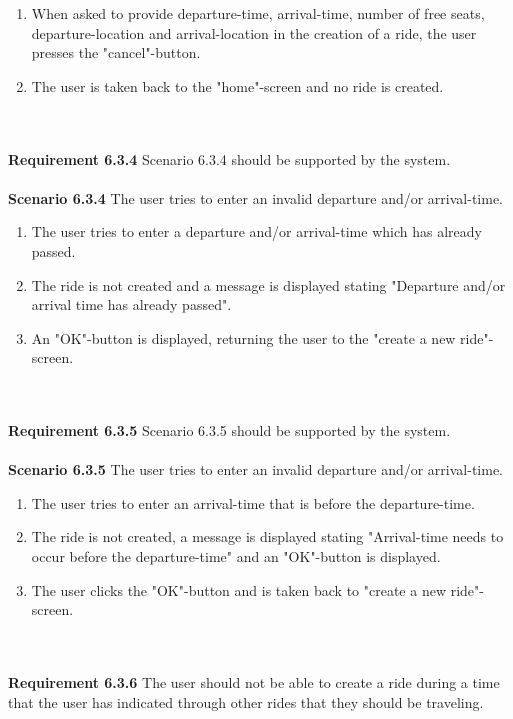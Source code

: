 \documentclass{article}
\begin{document}
\begin{enumerate}
    \item When asked to provide departure-time, arrival-time, number of free seats, departure-location and arrival-location in the creation of a ride, the user presses the "cancel"-button.
    \item The user is taken back to the "home"-screen and no ride is created.
\end{enumerate}
\mbox{}\\ \\
\textbf{Requirement 6.3.4} Scenario 6.3.4 should be supported by the system.
\\ \\
\textbf{Scenario 6.3.4} The user tries to enter an invalid departure and/or arrival-time.

\begin{enumerate}
    \item The user tries to enter a departure and/or arrival-time which has already passed.
    \item The ride is not created and a message is displayed stating "Departure and/or arrival time has already passed".
    \item An "OK"-button is displayed, returning the user to the "create a new ride"-screen.
\end{enumerate}
\mbox{}\\ \\
\textbf{Requirement 6.3.5} Scenario 6.3.5 should be supported by the system.
\\ \\
\textbf{Scenario 6.3.5} The user tries to enter an invalid departure and/or arrival-time.

\begin{enumerate}
    \item The user tries to enter an arrival-time that is before the departure-time.
    \item The ride is not created, a message is displayed stating "Arrival-time needs to occur before the departure-time" and an "OK"-button is displayed.
    \item The user clicks the "OK"-button and is taken back to "create a new ride"-screen.
\end{enumerate}
\mbox{}\\ \\
\textbf{Requirement 6.3.6} The user should not be able to create a ride during a time that the user has indicated through other rides that they should be traveling.
\\ \\
\\ \\
\end{document}
